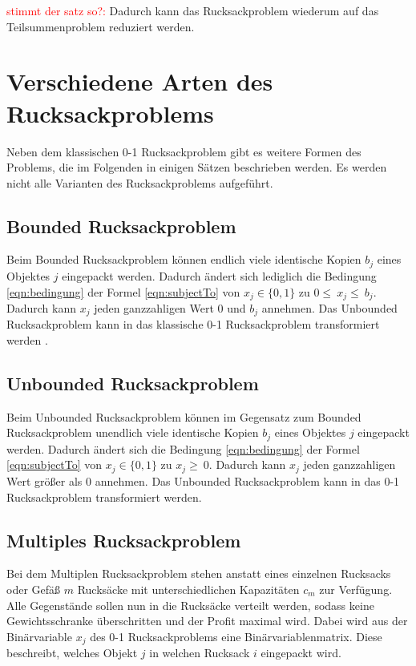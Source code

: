 \textcolor{red}{stimmt der satz so?:} Dadurch kann das Rucksackproblem wiederum auf das Teilsummenproblem reduziert werden. 

\section{Verschiedene Arten des Rucksackproblems}
Neben dem klassischen 0-1 Rucksackproblem gibt es weitere Formen des Problems, die im Folgenden in einigen Sätzen beschrieben werden. Es werden nicht alle Varianten des Rucksackproblems aufgeführt. 
\subsection{Bounded Rucksackproblem}
Beim Bounded Rucksackproblem können endlich viele identische Kopien $b_j$ eines Objektes $j$ eingepackt werden. Dadurch ändert sich lediglich die Bedingung \ref{eqn:bedingung} der Formel \ref{eqn:subjectTo} von $x_j\in\{0,1\}$ zu $0\le\ x_j\le\ b_j$. Dadurch kann $x_j$ jeden ganzzahligen Wert $0$ und $b_j$ annehmen. \cite[vgl.][]{Martello1990} Das Unbounded Rucksackproblem kann in das klassische 0-1 Rucksackproblem transformiert werden \cite[vgl.][]{Schury2013}.
\subsection{Unbounded Rucksackproblem}
Beim Unbounded Rucksackproblem können im Gegensatz zum Bounded Rucksackproblem unendlich viele identische Kopien $b_j$ eines Objektes $j$ eingepackt werden. Dadurch ändert sich die Bedingung \ref{eqn:bedingung} der Formel \ref{eqn:subjectTo} von $x_j\in\{0,1\}$ zu $x_j\geq\ 0$. Dadurch kann $x_j$ jeden ganzzahligen Wert größer als $0$ annehmen. Das Unbounded Rucksackproblem kann in das 0-1 Rucksackproblem transformiert werden. \cite[vgl.][]{Schury2013}
\subsection{Multiples Rucksackproblem}
Bei dem Multiplen Rucksackproblem stehen anstatt eines einzelnen Rucksacks oder Gefäß $m$ Rucksäcke mit unterschiedlichen Kapazitäten $c_m$ zur Verfügung. Alle Gegenstände sollen nun in die Rucksäcke verteilt werden, sodass keine Gewichtsschranke überschritten und der Profit maximal wird. Dabei wird aus der Binärvariable $x_j$ des 0-1 Rucksackproblems eine Binärvariablenmatrix. Diese beschreibt, welches Objekt $j$ in welchen Rucksack $i$ eingepackt wird. \cite[vgl.][]{Martello1990}
